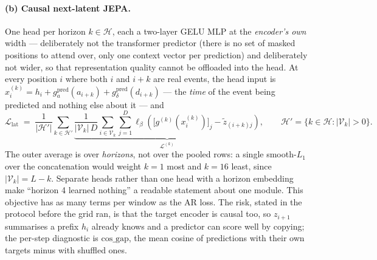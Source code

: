 \documentclass[11pt,a4paper]{article}
\begin{document}
\paragraph{(b) Causal next-latent JEPA.}
One head per horizon $k \in \mathcal{H}$, each a two-layer GELU MLP at the
\emph{encoder's own} width --- deliberately not the transformer predictor
(there is no set of masked positions to attend over, only one context vector per
prediction) and deliberately not wider, so that representation quality cannot be
offloaded into the head. At every position $i$ where both $i$ and $i+k$ are real
events, the head input is
$x^{(k)}_i = h_i + g^{\mathrm{pred}}_{a}(a_{i+k}) + g^{\mathrm{pred}}_{\delta}(d_{i+k})$
--- the \emph{time} of the event being predicted and nothing else about it --- and
\begin{equation}
\mathcal{L}_{\mathrm{lat}}
\;=\;
\frac{1}{|\mathcal{H}'|}\sum_{k \in \mathcal{H}'}
\underbrace{\frac{1}{|\mathcal{V}_k|\,D}
\sum_{i \in \mathcal{V}_k}\sum_{j=1}^{D}
\ell_\beta\!\left(\big[g^{(k)}(x^{(k)}_i)\big]_j - \tilde z_{(i+k)j}\right)}
_{\textstyle \mathcal{L}^{(k)}},
\qquad
\mathcal{H}' = \{k \in \mathcal{H} : |\mathcal{V}_k| > 0\}.
\end{equation}
The outer average is over \emph{horizons}, not over the pooled rows: a single
smooth-$L_1$ over the concatenation would weight $k{=}1$ most and $k{=}16$
least, since $|\mathcal{V}_k| = L - k$. Separate heads rather than one head with
a horizon embedding make ``horizon 4 learned nothing'' a readable statement
about one module. This objective has as many terms per window as the AR loss.
The risk, stated in the protocol before the grid ran, is that the target encoder
is causal too, so $z_{i+1}$ summarises a prefix $h_i$ already knows and a
predictor can score well by copying; the per-step diagnostic is
$\mathrm{cos\_gap}$, the mean cosine of predictions with their own targets minus
with shuffled ones.
\end{document}

